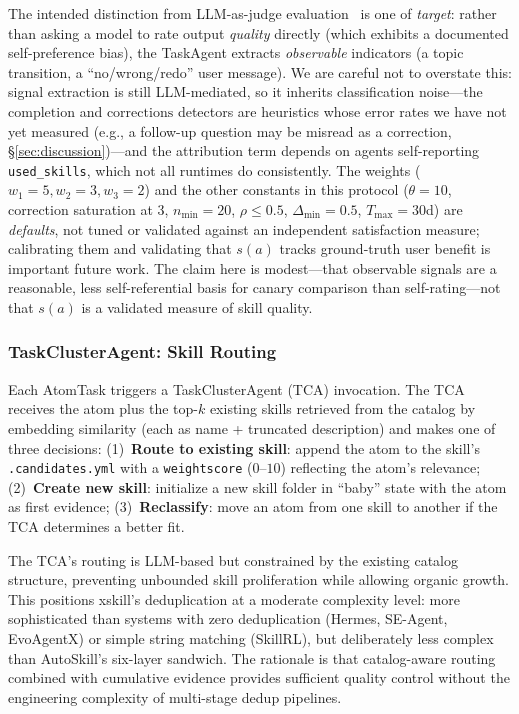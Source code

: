 \documentclass{article}
\begin{document}
The intended distinction from LLM-as-judge evaluation~\citep{zheng2024judging} is one of \emph{target}: rather than asking a model to rate output \emph{quality} directly (which exhibits a documented self-preference bias), the TaskAgent extracts \emph{observable} indicators (a topic transition, a ``no/wrong/redo'' user message). We are careful not to overstate this: signal extraction is still LLM-mediated, so it inherits classification noise---the $\mathrm{completion}$ and $\mathrm{corrections}$ detectors are heuristics whose error rates we have not yet measured (e.g., a follow-up question may be misread as a correction, \S\ref{sec:discussion})---and the attribution term depends on agents self-reporting \texttt{used\_skills}, which not all runtimes do consistently. The weights ($w_1{=}5,w_2{=}3,w_3{=}2$) and the other constants in this protocol ($\theta{=}10$, correction saturation at 3, $n_{\min}{=}20$, $\rho{\le}0.5$, $\Delta_{\min}{=}0.5$, $T_{\max}{=}30$d) are \emph{defaults}, not tuned or validated against an independent satisfaction measure; calibrating them and validating that $s(a)$ tracks ground-truth user benefit is important future work. The claim here is modest---that observable signals are a reasonable, less self-referential basis for canary comparison than self-rating---not that $s(a)$ is a validated measure of skill quality.

\subsubsection{TaskClusterAgent: Skill Routing}

Each AtomTask triggers a TaskClusterAgent (TCA) invocation. The TCA receives the atom plus the top-$k$ existing skills retrieved from the catalog by embedding similarity (each as name + truncated description) and makes one of three decisions: (1)~\textbf{Route to existing skill}: append the atom to the skill's \texttt{.candidates.yml} with a \texttt{weightscore} ($0$--$10$) reflecting the atom's relevance; (2)~\textbf{Create new skill}: initialize a new skill folder in ``baby'' state with the atom as first evidence; (3)~\textbf{Reclassify}: move an atom from one skill to another if the TCA determines a better fit.

The TCA's routing is LLM-based but constrained by the existing catalog structure, preventing unbounded skill proliferation while allowing organic growth. This positions xskill's deduplication at a moderate complexity level: more sophisticated than systems with zero deduplication (Hermes, SE-Agent, EvoAgentX) or simple string matching (SkillRL), but deliberately less complex than AutoSkill's six-layer sandwich. The rationale is that catalog-aware routing combined with cumulative evidence provides sufficient quality control without the engineering complexity of multi-stage dedup pipelines.
\end{document}
